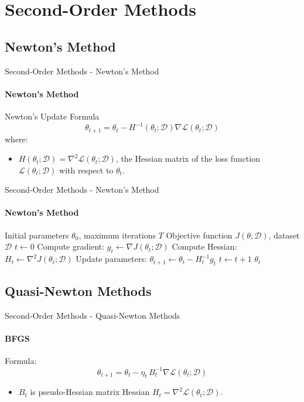 \documentclass{beamer}
\begin{document}
\section{Second-Order Methods} 

\subsection{Newton’s Method}
\begin{frame}{Second-Order Methods - Newton's Method}
\framesubtitle{Newton's Method}
\begin{block}{Newton's Update Formula}
\[
\theta_{t+1} = \theta_t - H^{-1}(\theta_t; \mathcal{D}) \nabla \mathcal{L}(\theta_t; \mathcal{D})
\]
where:
\begin{itemize}
    \item \( H(\theta_t; \mathcal{D}) = \nabla^2 \mathcal{L}(\theta_t; \mathcal{D}) \), the Hessian matrix of the loss function \(\mathcal{L}(\theta_t; \mathcal{D})\) with respect to \(\theta_t\).
\end{itemize}
\end{block}
\end{frame}

\begin{frame}[fragile]{Second-Order Methods - Newton's Method}
\framesubtitle{Newton's Method}

\small
\begin{algorithm}[H]
\caption{Newton's Method}
\begin{algorithmic}[1]
\Require Initial parameters $\theta_0$, maximum iterations $T$
\Require Objective function $J(\theta;\mathcal D)$, dataset $\mathcal D$
\State $t \gets 0$
    \State Compute gradient: $g_t \gets \nabla J(\theta_t; \mathcal D)$
    \State Compute Hessian: $H_t \gets \nabla^2 J(\theta_t; \mathcal D)$
    \State Update parameters: $\theta_{t+1} \gets \theta_t - H_t^{-1} g_t$
    \State $t \gets t + 1$
\EndWhile
\State \Return $\theta_t$
\end{algorithmic}
\end{algorithm}
\end{frame}

\subsection{Quasi-Newton Methods}
\begin{frame}{Second-Order Methods - Quasi-Newton Methods}
\framesubtitle{BFGS}
\small
\begin{block}{Formula:}
\[
\theta_{t+1} = \theta_t - \eta_t\, B_t^{-1} \nabla \mathcal L(\theta_t; \mathcal D)
\]
\begin{itemize}
    \item $B_t$ is pseudo-Hessian
matrix Hessian $H_t = \nabla^2 \mathcal L(\theta_t; \mathcal D)$.

\end{itemize}
\end{block}

\end{frame}
\end{document}
